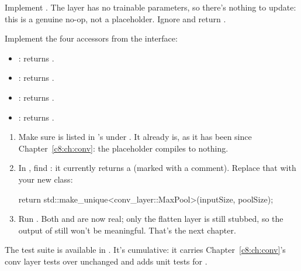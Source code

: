\label{c9:ex:7}
Implement . The layer has no trainable
parameters, so there's nothing to update: this is a genuine no-op, not a placeholder. Ignore
 and return .

\label{c9:ex:8}
Implement the four accessors from the interface:
\begin{itemize}
  \item \textbf{}: returns .
  \item \textbf{}: returns .
  \item \textbf{}: returns .
  \item \textbf{}: returns .
\end{itemize}

\label{c9:set:2}

\label{c9:ex:9}
\begin{enumerate}
  \item Make sure  is listed in 's
     under . It already is, as it has been since
    Chapter~\ref{c8:ch:conv}: the placeholder compiles to nothing.
  \item In , find : it currently
    returns a  (marked with a  comment). Replace that
    with your new class:
\begin{cppcode}
return std::make_unique<conv_layer::MaxPool>(inputSize, poolSize);
\end{cppcode}
  \item Run . Both  and  are now real; only the flatten layer
    is still stubbed, so the output of  still won't be meaningful. That's the next
    chapter.
\end{enumerate}

\label{c9:set:3}

\label{c9:ex:10}
The test suite is available in . It's cumulative: it
carries Chapter~\ref{c8:ch:conv}'s conv layer tests over unchanged and adds unit tests for
.

